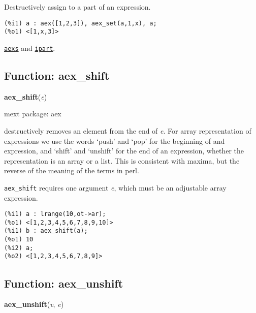 \documentclass[]{article}
\begin{document}
\vspace{5 pt}


   Destructively assign to a part of an expression. 

\begin{Verbatim}[frame=single]
(%i1) a : aex([1,2,3]), aex_set(a,1,x), a;
(%o1) <[1,x,3]>
\end{Verbatim}


 \hyperlink{aexs}{{\tt aexs}} and \hyperlink{ipart}{{\tt ipart}}.

\vspace{5 pt}


\subsection{Function: aex\_shift\label{sec:aex_shift}}
\hypertarget{aex_shift}{}
{\bf aex\_shift}({\it e})


\noindent mext package: aex



\vspace{5 pt}
destructively removes an element from the end of {\it e}. For array representation of expressions we use the words `push' and `pop' for the beginning of and expression, and `shift' and `unshift' for the end of an expression, whether the representation is an array or a list. This is consistent with 
maxima, but the reverse of the meaning of the terms in perl. 

\vspace{5 pt}

   {\tt aex\_shift} requires one argument {\it e}, which must be an adjustable array expression.


\vspace{5 pt}


\begin{Verbatim}[frame=single]
(%i1) a : lrange(10,ot->ar);
(%o1) <[1,2,3,4,5,6,7,8,9,10]>
(%i1) b : aex_shift(a);
(%o1) 10
(%i2) a;
(%o2) <[1,2,3,4,5,6,7,8,9]>
\end{Verbatim}


\subsection{Function: aex\_unshift\label{sec:aex_unshift}}
\hypertarget{aex_unshift}{}
{\bf aex\_unshift}({\it v}, {\it e})
\end{document}
